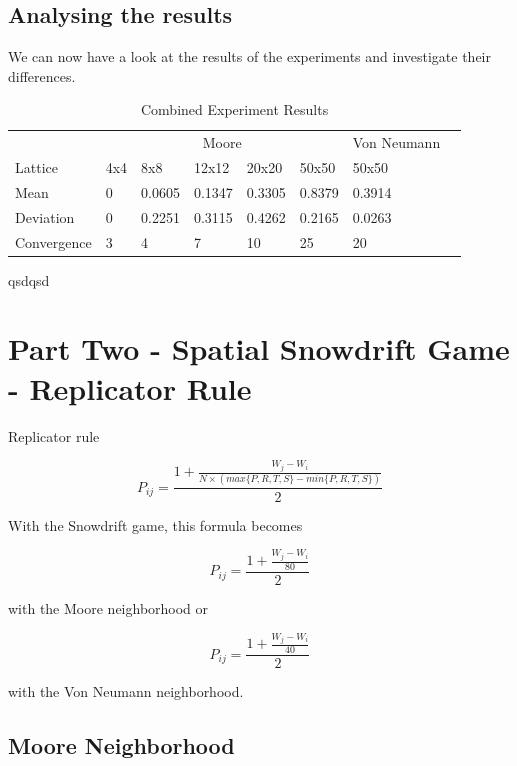 \documentclass[a4paper, 11pt]{article}
\begin{document}
\newpage
\subsection{Analysing the results}

We can now have a look at the results of the experiments and investigate their differences.

\begin{table}[H]
\centering
\caption{Combined Experiment Results}
\begin{tabular}{l|l|l|l|l|l|l|l}
            & \multicolumn{5}{c|}{Moore}              & Von Neumann &  \\ \cline{1-7}
Lattice     & 4x4 & 8x8    & 12x12  & 20x20  & 50x50  & 50x50       &  \\ \cline{1-7}
Mean        & 0   & 0.0605 & 0.1347 & 0.3305 & 0.8379 & 0.3914      &  \\ \cline{1-7}
Deviation   & 0   & 0.2251 & 0.3115 & 0.4262 & 0.2165 & 0.0263      &  \\ \cline{1-7}
Convergence & 3   & 4      & 7      & 10     & 25     & 20          &  \\ \cline{1-7}
\end{tabular}
\end{table}

qsdqsd


\newpage
\section{Part Two - Spatial Snowdrift Game - Replicator Rule}

Replicator rule

\[ P_{ij} = \frac{1+ \frac{W_j-W_i}{N \times (max\{P,R,T,S\} - min\{P,R,T,S\})}}{2} \]

With the Snowdrift game, this formula becomes

\[ P_{ij} = \frac{1+ \frac{W_j-W_i}{80}}{2} \]

with the Moore neighborhood or

\[ P_{ij} = \frac{1+ \frac{W_j-W_i}{40}}{2} \]

with the Von Neumann neighborhood.



\newpage

\subsection{Moore Neighborhood}
\end{document}
